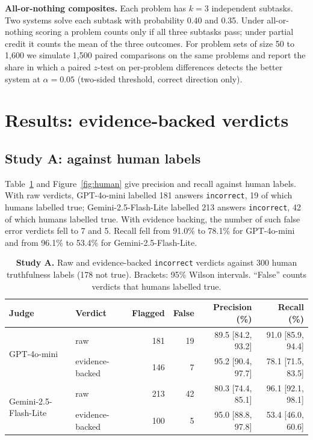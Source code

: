 \textbf{All-or-nothing composites.} Each problem has $k = 3$ independent subtasks. Two systems solve each subtask with probability 0.40 and 0.35. Under all-or-nothing scoring a problem counts only if all three subtasks pass; under partial credit it counts the mean of the three outcomes. For problem sets of size 50 to 1{,}600 we simulate 1{,}500 paired comparisons on the same problems and report the share in which a paired $z$-test on per-problem differences detects the better system at $\alpha = 0.05$ (two-sided threshold, correct direction only).

\section{Results: evidence-backed verdicts}
\label{sec:results-judge}

\subsection{Study A: against human labels}

Table~\ref{tab:human} and Figure~\ref{fig:human} give precision and recall against human labels. With raw verdicts, GPT-4o-mini labelled 181 answers \texttt{incorrect}, 19 of which humans labelled true; Gemini-2.5-Flash-Lite labelled 213 answers \texttt{incorrect}, 42 of which humans labelled true. With evidence backing, the number of such false error verdicts fell to 7 and 5. Recall fell from 91.0\% to 78.1\% for GPT-4o-mini and from 96.1\% to 53.4\% for Gemini-2.5-Flash-Lite.

\begin{table}[t]
\caption{\textbf{Study A.} Raw and evidence-backed \texttt{incorrect} verdicts against 300 human truthfulness labels (178 not true). Brackets: 95\% Wilson intervals. ``False'' counts verdicts that humans labelled true.}
\label{tab:human}
\centering
\begin{tabular}{llrrrr}
\toprule
Judge & Verdict & Flagged & False & Precision (\%) & Recall (\%) \\
\midrule
\multirow{2}{*}{GPT-4o-mini} & raw & 181 & 19 & 89.5 [84.2, 93.2] & 91.0 [85.9, 94.4] \\
 & evidence-backed & 146 & 7 & 95.2 [90.4, 97.7] & 78.1 [71.5, 83.5] \\
\midrule
\multirow{2}{*}{Gemini-2.5-Flash-Lite} & raw & 213 & 42 & 80.3 [74.4, 85.1] & 96.1 [92.1, 98.1] \\
 & evidence-backed & 100 & 5 & 95.0 [88.8, 97.8] & 53.4 [46.0, 60.6] \\
\bottomrule
\end{tabular}
\end{table}

